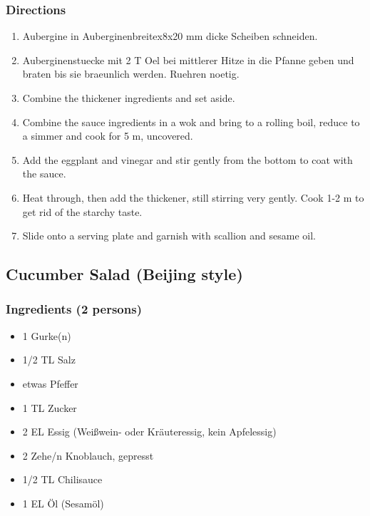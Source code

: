 \subsubsection*{Directions}
\begin{enumerate}
\item Aubergine in Auberginenbreitex8x20 mm dicke Scheiben schneiden.
\item Auberginenstuecke mit 2 T Oel bei mittlerer Hitze in die Pfanne geben und braten bis sie braeunlich werden. Ruehren noetig.
\item Combine the thickener ingredients and set aside.
\item Combine the sauce ingredients in a wok and bring to a rolling boil, reduce to a simmer and cook for 5 m, uncovered.
\item Add the eggplant and vinegar and stir gently from the bottom to coat with the sauce.
\item Heat through, then add the thickener, still stirring very gently. Cook 1-2 m to get rid of the starchy taste.
\item Slide onto a serving plate and garnish with scallion and sesame oil.
\end{enumerate}
\pagebreak

\subsection{Cucumber Salad (Beijing style)}
\subsubsection*{Ingredients (2 persons)}
\begin{itemize}
\item[] 1 	 Gurke(n)
\item[] 1/2 TL	 Salz
\item[]  etwas	 Pfeffer
\item[] 1 TL	 Zucker
\item[] 2 EL	 Essig (Weißwein- oder Kräuteressig, kein Apfelessig)
\item[] 2 Zehe/n	 Knoblauch, gepresst
\item[] 1/2 TL	 Chilisauce
\item[] 1 EL	 Öl (Sesamöl)
\end{itemize}
